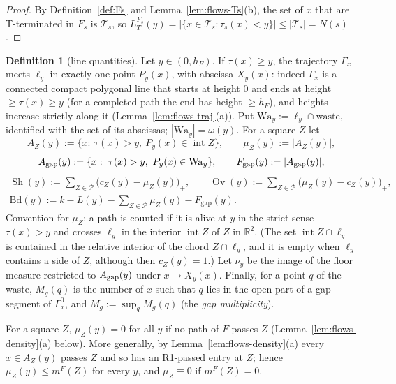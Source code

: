 \documentclass[11pt]{amsart}
\newcommand{\R}{\mathbb R}
\newcommand{\Sh}{\operatorname{Sh}}
\newcommand{\Ov}{\operatorname{Ov}}
\newcommand{\Fgap}{F_{\mathrm{gap}}}
\newcommand{\Fs}{F_{s}}
\theoremstyle{definition}
\newtheorem{definition}[theorem]{Definition}
\theoremstyle{remark}
\numberwithin{equation}{section}
\begin{document}
\begin{proof}
By Definition~\ref{def:Fs} and Lemma~\ref{lem:flows-Ts}(b), the set of $x$ that are T-terminated in $\Fs$ is $\mathcal T_s$,
so $L^{\Fs}_T(y)=|\{x\in\mathcal T_s:\tau_s(x)<y\}|\le|\mathcal T_s|=N(s)$.
\end{proof}

\begin{definition}[line quantities]\label{def:flows-line}
Let $y\in(0,h_F)$. If $\tau(x)\ge y$, the trajectory $\Gamma_x$ meets $\ell_y$ in exactly one point $P_y(x)$, with
abscissa $X_y(x)$: indeed $\Gamma_x$ is a connected compact polygonal line that starts at height $0$ and ends at height
$\ge\tau(x)\ge y$ (for a completed path the end has height $\ge h_F$), and heights increase strictly along it
(Lemma~\ref{lem:flows-traj}(a)). Put $\mathrm{Wa}_y:=\ell_y\cap\text{waste}$, identified with the set of its abscissas;
$|\mathrm{Wa}_y|=\omega(y)$. For a square $Z$ let
\[
A_Z(y):=\{x:\ \tau(x)>y,\ P_y(x)\in\operatorname{int}Z\},\qquad \mu_Z(y):=|A_Z(y)|,
\]
\[
A_{\rm gap}(y):=\{x:\ \tau(x)>y,\ P_y(x)\in\mathrm{Wa}_y\},\qquad \Fgap(y):=|A_{\rm gap}(y)|,
\]
\begin{gather*}
\Sh(y):=\sum_{Z\in\mathcal P}\big(c_Z(y)-\mu_Z(y)\big)_+,\qquad \Ov(y):=\sum_{Z\in\mathcal P}\big(\mu_Z(y)-c_Z(y)\big)_+,\\
\mathrm{Bd}(y):=k-L(y)-\sum_{Z\in\mathcal P}\mu_Z(y)-\Fgap(y).
\end{gather*}
Convention for $\mu_Z$: a path is counted if it is alive at $y$ in the strict sense $\tau(x)>y$ and crosses $\ell_y$ in
the interior $\operatorname{int}Z$ of $Z$ in $\R^2$. (The set $\operatorname{int}Z\cap\ell_y$ is contained in the relative
interior of the chord $Z\cap\ell_y$, and it is empty when $\ell_y$ contains a side of $Z$, although then $c_Z(y)=1$.)
Let $\nu_y$ be the image of the floor measure restricted to $A_{\rm gap}(y)$ under $x\mapsto X_y(x)$. Finally, for a
point $q$ of the waste, $M_g(q)$ is the number of $x$ such that $q$ lies in the open part of a gap segment of
$\Gamma^0_x$, and $M_g:=\sup_qM_g(q)$ (the \emph{gap multiplicity}).
\end{definition}

For a square $Z$, $\mu_Z(y)=0$ for all $y$ if no path of $F$ passes $Z$ (Lemma~\ref{lem:flows-density}(a) below).
More generally, by Lemma~\ref{lem:flows-density}(a) every $x\in A_Z(y)$ passes $Z$ and so has an R1-passed entry at $Z$;
hence $\mu_Z(y)\le m^F(Z)$ for every $y$, and $\mu_Z\equiv0$ if $m^F(Z)=0$.
\end{document}
